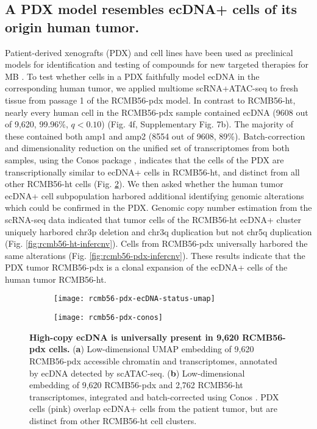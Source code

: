 \subsection{A PDX model resembles ecDNA+ cells of its origin human tumor.}

Patient-derived xenografts (PDX) and cell lines have been used as preclinical models for identification and testing of compounds for new targeted therapies for MB \cite{rusert_2020}. To test whether cells in a PDX faithfully model ecDNA in the corresponding human tumor, we applied multiome scRNA+ATAC-seq to fresh tissue from passage 1 of the RCMB56-pdx model. In contrast to RCMB56-ht, nearly every human cell in the RCMB56-pdx sample contained ecDNA (9608 out of 9,620, 99.96\%, $q < 0.10$) (Fig. 4f, Supplementary Fig. 7b). The majority of these contained both amp1 and amp2 (8554 out of 9608, 89\%). Batch-correction and dimensionality reduction on the unified set of transcriptomes from both samples, using the Conos package \cite{conos_2019}, indicates that the cells of the PDX are transcriptionally similar to ecDNA+ cells in RCMB56-ht, and distinct from all other RCMB56-ht cells (Fig. \ref{fig:rcmb56-pdx-clustering}). We then asked whether the human tumor ecDNA+ cell subpopulation harbored additional identifying genomic alterations which could be confirmed in the PDX. Genomic copy number estimation from the scRNA-seq data indicated that tumor cells of the RCMB56-ht ecDNA+ cluster uniquely harbored chr3p deletion and chr3q duplication but not chr5q duplication (Fig. \ref{fig:rcmb56-ht-infercnv}). Cells from RCMB56-pdx universally harbored the same alterations (Fig. \ref{fig:rcmb56-pdx-infercnv}). These results indicate that the PDX tumor RCMB56-pdx is a clonal expansion of the ecDNA+ cells of the human tumor RCMB56-ht. 

\begin{figure}[!h]
    \centering
    \begin{subfigure}{.49\textwidth}
        \centering
        \texttt{[image: rcmb56-pdx-ecDNA-status-umap]}
        \caption{}
    \end{subfigure}
    \begin{subfigure}{.49\textwidth}
        \centering
        \texttt{[image: rcmb56-pdx-conos]}
        \caption{}
        \label{subfig:conos}
    \end{subfigure}
    \caption[High-copy ecDNA is universally present in 9,620 RCMB56-pdx cells.]{\textbf{High-copy ecDNA is universally present in 9,620 RCMB56-pdx cells.} (\textbf{a}) Low-dimensional UMAP embedding of 9,620 RCMB56-pdx accessible chromatin and transcriptomes, annotated by ecDNA detected by scATAC-seq. (\textbf{b}) Low-dimensional embedding of 9,620 RCMB56-pdx and 2,762 RCMB56-ht transcriptomes, integrated and batch-corrected using Conos \cite{conos_2019}. PDX cells (pink) overlap ecDNA+ cells from the patient tumor, but are distinct from other RCMB56-ht cell clusters.}
    \label{fig:rcmb56-pdx-clustering}
\end{figure}


